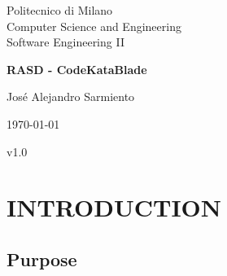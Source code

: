 \documentclass{article}
\begin{document}
\begin{titlepage}
    \begin{center}
        
        Politecnico di Milano\\
      
        Computer Science and Engineering\\
        
        Software Engineering II\\

        \vfill
        
        {\Large \textbf{RASD - CodeKataBlade}}\\
        
        \vfill

        José Alejandro Sarmiento

        \today

        v1.0
        
    \end{center}
\end{titlepage}
\newpage


\tableofcontents


\section{INTRODUCTION}
\subsection{Purpose}
\end{document}
